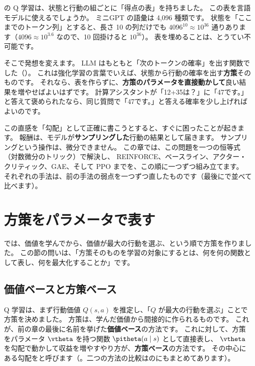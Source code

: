 の Q 学習は、状態と行動の組ごとに「得点の表」を持ちました。
この表を言語モデルに使えるでしょうか。
ミニGPT の語彙は 4,096 種類です。
状態を「ここまでのトークン列」とすると、長さ 10 の列だけでも $4096^{10}\approx10^{36}$ 通りあります（$4096\approx10^{3.6}$ なので、10 回掛けると $10^{36}$）。
表を埋めることは、とうてい不可能です。

そこで発想を変えます。
LLM はもともと「次のトークンの確率」を出す関数でした（）。
これは強化学習の言葉でいえば、状態から行動の確率を出す\textbf{方策}そのものです。
それなら、表を作らずに、\textbf{方策のパラメータを直接動かして}良い結果を増やせばよいはずです。
計算アシスタントが「12+35は？」に「47です。」と答えて褒められたなら、同じ質問で「47です。」と答える確率を少し上げればよいのです。

この直感を「勾配」として正確に書こうとすると、すぐに困ったことが起きます。
報酬は、モデルが\textbf{サンプリングした}行動の結果として届きます。
サンプリングという操作は、微分できません。
この章では、この問題を一つの恒等式（対数微分のトリック）で解決し、
REINFORCE、ベースライン、アクター・クリティック、GAE、そして PPO までを、この順に一つずつ組み立てます。
それぞれの手法は、前の手法の弱点を一つずつ直したものです（最後にで並べて比べます）。

\section{方策をパラメータで表す}\label{sec:pg-param}

では、価値を学んでから、価値が最大の行動を選ぶ、という順で方策を作りました。
この節の問いは、「方策そのものを学習の対象にするとは、何を何の関数として表し、何を最大化することか」です。

\subsection*{価値ベースと方策ベース}

Q 学習は、まず行動価値 $Q(s,a)$ を推定し、「$Q$ が最大の行動を選ぶ」ことで方策を決めました。
方策は、学んだ価値から間接的に作られるものです。
これが、前の章の最後に名前を挙げた\textbf{価値ベース}の方法です。
これに対して、方策をパラメータ $\vtheta$ を持つ関数 $\pitheta(a\mid s)$ として直接表し、
$\vtheta$ を勾配で動かして収益を増やすやり方が、\textbf{方策ベース}の方法です。
その中心にある勾配をと呼びます（。二つの方法の比較はのにもまとめてあります）。

